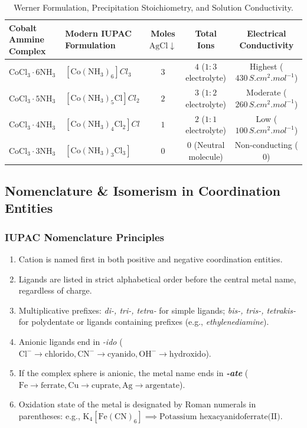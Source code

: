 \documentclass[10pt,a4paper]{article}
\begin{document}
\begin{table}[htbp]
\centering
\small
\renewcommand{\arraystretch}{1.25}
\begin{tabularx}{\textwidth}{p{3.2cm} p{3.2cm} c c c}
\toprule
\textbf{Cobalt Ammine Complex} & \textbf{Modern IUPAC Formulation} & \textbf{Moles $\mathrm{AgCl\downarrow}$} & \textbf{Total Ions} & \textbf{Electrical Conductivity} \\
\midrule
$\mathrm{CoCl_3\cdot 6NH_3}$ & $[\mathrm{Co(NH_3)_6}]Cl_3$ & $3$ & $4$ ($1:3$ electrolyte) & Highest ($430\,\si{S.cm^2.mol^{-1}}$) \\
$\mathrm{CoCl_3\cdot 5NH_3}$ & $[\mathrm{Co(NH_3)_5Cl}]Cl_2$ & $2$ & $3$ ($1:2$ electrolyte) & Moderate ($260\,\si{S.cm^2.mol^{-1}}$) \\
$\mathrm{CoCl_3\cdot 4NH_3}$ & $[\mathrm{Co(NH_3)_4Cl_2}]Cl$ & $1$ & $2$ ($1:1$ electrolyte) & Low ($100\,\si{S.cm^2.mol^{-1}}$) \\
$\mathrm{CoCl_3\cdot 3NH_3}$ & $[\mathrm{Co(NH_3)_3Cl_3}]$ & $0$ & $0$ (Neutral molecule) & Non-conducting ($0$) \\
\bottomrule
\end{tabularx}
\caption{Werner Formulation, Precipitation Stoichiometry, and Solution Conductivity.}
\end{table}

\subsection{Nomenclature \& Isomerism in Coordination Entities}
\subsubsection{IUPAC Nomenclature Principles}
\begin{enumerate}
  \item Cation is named first in both positive and negative coordination entities.
  \item Ligands are listed in strict alphabetical order before the central metal name, regardless of charge.
  \item Multiplicative prefixes: \textit{di-, tri-, tetra-} for simple ligands; \textit{bis-, tris-, tetrakis-} for polydentate or ligands containing prefixes (e.g., \textit{ethylenediamine}).
  \item Anionic ligands end in \textit{-ido} ($\mathrm{Cl^-} \to \text{chlorido}, \mathrm{CN^-} \to \text{cyanido}, \mathrm{OH^-} \to \text{hydroxido}$).
  \item If the complex sphere is anionic, the metal name ends in \textbf{\textit{-ate}} ($\mathrm{Fe} \to \text{ferrate}, \mathrm{Cu} \to \text{cuprate}, \mathrm{Ag} \to \text{argentate}$).
  \item Oxidation state of the metal is designated by Roman numerals in parentheses: e.g., $\mathrm{K_4[Fe(CN)_6]} \implies \text{Potassium hexacyanidoferrate(II)}$.
\end{enumerate}
\end{document}
